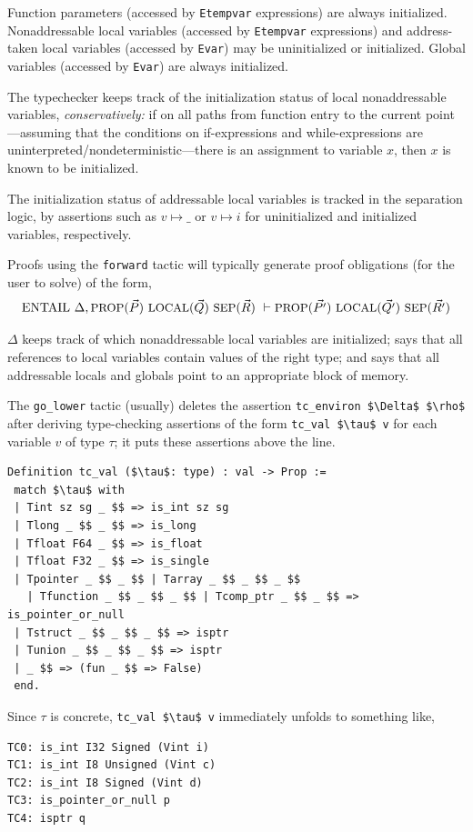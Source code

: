 \documentclass[12pt,fleqn,openany,oneside,showtrims]{memoir}
\begin{document}
Function parameters (accessed by
\lstinline{Etempvar} expressions)
are always initialized.
Nonaddressable local variables (accessed by
\lstinline{Etempvar} expressions) and address-taken local variables
(accessed by \lstinline{Evar})
may be uninitialized or initialized. 
Global variables (accessed by \lstinline{Evar}) are always
initialized.

The typechecker keeps track of the
initialization status of local nonaddressable 
variables, \emph{conservatively:}
if on all paths from function entry to the current
point---assuming that the conditions on if-expressions
and while-expressions are uninterpreted/nondeterministic---there
is an assignment to variable $x$, then $x$ is known to
be initialized.

The initialization status of addressable local variables
is tracked in the separation logic,
by assertions such as $v \mapsto \_$
or $v \mapsto i$ for uninitialized and initialized variables,
respectively.

Proofs using the \lstinline{forward} tactic will typically
generate proof obligations (for the user to solve)
of the form,
\[
\mathrm{ENTAIL}~\Delta,
\mbox{\small PROP}(\vec{P})~
\mbox{\small LOCAL}(\vec{Q})~
\mbox{\small SEP}(\vec{R})
~\vdash
\mbox{\small PROP}(\vec{P'})~
\mbox{\small LOCAL}(\vec{Q'})~
\mbox{\small SEP}(\vec{R'})
\]

$\Delta$
keeps track of which nonaddressable local variables are initialized;
says that all references to local variables
contain values of the right type;
and says that all addressable locals and globals point
to an appropriate block of memory.

The \lstinline{go_lower} tactic
(usually) deletes the assertion 
\lstinline{tc_environ $\Delta$ $\rho$}
after deriving type-checking assertions of the form
\lstinline{tc_val $\tau$ v}
for each variable $v$ of type $\tau$;
it puts these assertions above the line.
\pagebreak
\begin{lstlisting}
Definition tc_val ($\tau$: type) : val -> Prop :=
 match $\tau$ with 
 | Tint sz sg _ $$ => is_int sz sg
 | Tlong _ $$ _ $$ => is_long 
 | Tfloat F64 _ $$ => is_float
 | Tfloat F32 _ $$ => is_single
 | Tpointer _ $$ _ $$ | Tarray _ $$ _ $$ _ $$ 
   | Tfunction _ $$ _ $$ _ $$ | Tcomp_ptr _ $$ _ $$ => is_pointer_or_null
 | Tstruct _ $$ _ $$ _ $$ => isptr
 | Tunion _ $$ _ $$ _ $$ => isptr
 | _ $$ => (fun _ $$ => False)
 end.
\end{lstlisting}
Since $\tau$ is concrete, \lstinline{tc_val $\tau$ v}
immediately unfolds
to something like,
\begin{lstlisting}
TC0: is_int I32 Signed (Vint i)
TC1: is_int I8 Unsigned (Vint c)
TC2: is_int I8 Signed (Vint d)
TC3: is_pointer_or_null p
TC4: isptr q
\end{lstlisting}
\end{document}
